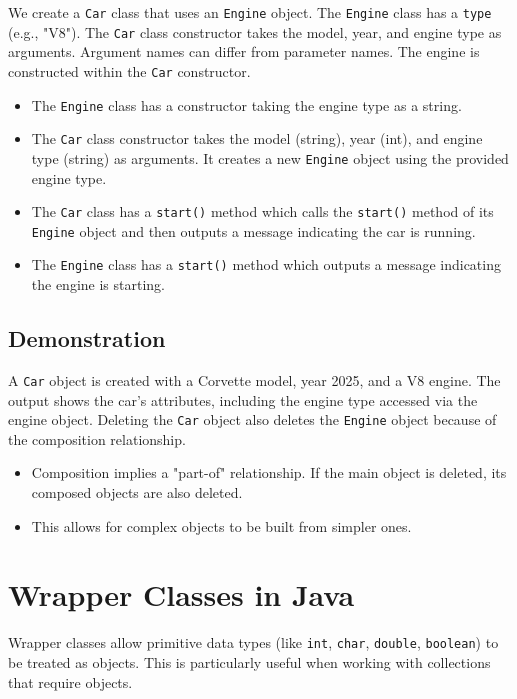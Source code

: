 \documentclass{article}
\begin{document}
We create a \texttt{Car} class that uses an \texttt{Engine} object. The \texttt{Engine} class has a \texttt{type} (e.g., "V8").  The \texttt{Car} class constructor takes the model, year, and engine type as arguments.  Argument names can differ from parameter names.  The engine is constructed within the \texttt{Car} constructor.

\begin{itemize}
    \item The \texttt{Engine} class has a constructor taking the engine type as a string.
    \item The \texttt{Car} class constructor takes the model (string), year (int), and engine type (string) as arguments. It creates a new \texttt{Engine} object using the provided engine type.
    \item The \texttt{Car} class has a \texttt{start()} method which calls the \texttt{start()} method of its \texttt{Engine} object and then outputs a message indicating the car is running.
    \item The \texttt{Engine} class has a \texttt{start()} method which outputs a message indicating the engine is starting.
\end{itemize}

\subsection{Demonstration}

A \texttt{Car} object is created with a Corvette model, year 2025, and a V8 engine.  The output shows the car's attributes, including the engine type accessed via the engine object.  Deleting the \texttt{Car} object also deletes the \texttt{Engine} object because of the composition relationship.

\begin{itemize}
    \item Composition implies a "part-of" relationship.  If the main object is deleted, its composed objects are also deleted.
    \item This allows for complex objects to be built from simpler ones.
\end{itemize}


\section{Wrapper Classes in Java}

Wrapper classes allow primitive data types (like \texttt{int}, \texttt{char}, \texttt{double}, \texttt{boolean}) to be treated as objects.  This is particularly useful when working with collections that require objects.
\end{document}
